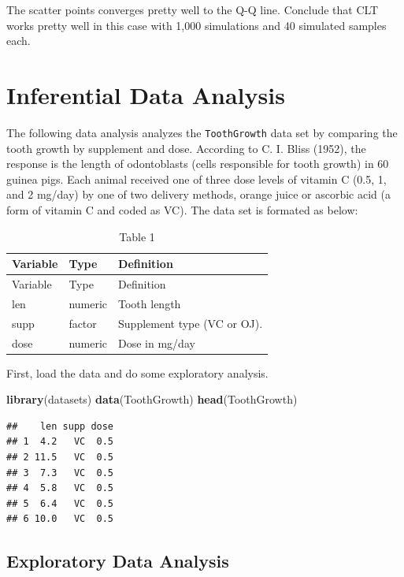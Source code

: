 \documentclass[]{article}
\newenvironment{Shaded}{\begin{snugshade}}{\end{snugshade}}
\newcommand{\KeywordTok}[1]{\textcolor[rgb]{0.13,0.29,0.53}{\textbf{#1}}}
\newcommand{\NormalTok}[1]{#1}
\begin{document}
The scatter points converges pretty well to the Q-Q line. Conclude that
CLT works pretty well in this case with 1,000 simulations and 40
simulated samples each.

\newpage

\section{Inferential Data Analysis}\label{inferential-data-analysis}

The following data analysis analyzes the \texttt{ToothGrowth} data set
by comparing the tooth growth by supplement and dose. According to C. I.
Bliss (1952), the response is the length of odontoblasts (cells
responsible for tooth growth) in 60 guinea pigs. Each animal received
one of three dose levels of vitamin C (0.5, 1, and 2 mg/day) by one of
two delivery methods, orange juice or ascorbic acid (a form of vitamin C
and coded as VC). The data set is formated as below:

\begin{longtable}[]{@{}lll@{}}
\caption{Table 1}\tabularnewline
\toprule
Variable & Type & Definition\tabularnewline
\midrule
\endfirsthead
\toprule
Variable & Type & Definition\tabularnewline
\midrule
\endhead
len & numeric & Tooth length\tabularnewline
supp & factor & Supplement type (VC or OJ).\tabularnewline
dose & numeric & Dose in mg/day\tabularnewline
\bottomrule
\end{longtable}

First, load the data and do some exploratory analysis.

\begin{Shaded}
\begin{Highlighting}[]
\KeywordTok{library}\NormalTok{(datasets)}
\KeywordTok{data}\NormalTok{(ToothGrowth)}
\KeywordTok{head}\NormalTok{(ToothGrowth)}
\end{Highlighting}
\end{Shaded}

\begin{verbatim}
##    len supp dose
## 1  4.2   VC  0.5
## 2 11.5   VC  0.5
## 3  7.3   VC  0.5
## 4  5.8   VC  0.5
## 5  6.4   VC  0.5
## 6 10.0   VC  0.5
\end{verbatim}

\newpage

\subsection{Exploratory Data Analysis}\label{exploratory-data-analysis}
\end{document}
